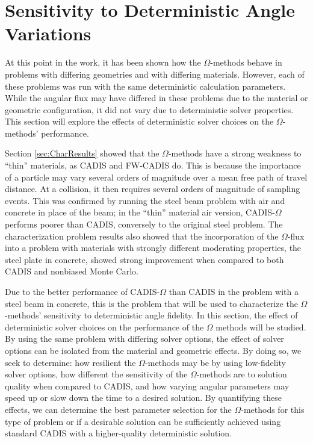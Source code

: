 \section{Sensitivity to Deterministic Angle Variations}
\label{sec:AngleResults}

At this point in the work, it has been shown how the $\Omega$-methods
behave in problems with differing geometries and with differing materials.
However, each of these problems was run with the same deterministic calculation
parameters. While the angular flux may have differed in these problems due to
the material or geometric configuration, it did not vary due to deterministic
solver properties. This section will explore the effects of deterministic solver
choices on the $\Omega$-methods' performance.

Section \ref{sec:CharResults} showed that the $\Omega$-methods have a strong
weakness to ``thin'' materials, as CADIS and FW-CADIS do. This is because the
importance of a particle may vary several orders of magnitude over a mean free
path of travel distance. At a collision, it then requires several orders of
magnitude of sampling events. This was confirmed by
running the steel beam problem with air and concrete in place of the beam; in
the ``thin'' material air version, CADIS-$\Omega$ performs poorer than CADIS,
conversely to the original steel problem.
The characterization problem results also showed that
the incorporation of the $\Omega$-flux into a problem with materials with
strongly different moderating properties, the steel plate in concrete, showed
strong improvement when compared to both CADIS and nonbiased Monte Carlo.

Due to the better performance of CADIS-$\Omega$ than CADIS
in the problem with a steel beam in concrete, this is the problem that will be
used to characterize the $\Omega$-methods' sensitivity to deterministic angle
fidelity. In this section, the effect of deterministic solver choices on the
performance of the $\Omega$ methods will be studied. By using the same problem
with differing solver options, the effect of solver options can be isolated from
the material and geometric effects. By doing so, we seek to determine: how
resilient the $\Omega$-methods may be by using low-fidelity solver options, how
different the sensitivity of the $\Omega$-methods are to solution quality when
compared to CADIS, and how varying angular parameters may speed up or slow down
the time to a desired solution. By quantifying these effects, we can determine
the best parameter selection for the $\Omega$-methods for this type of problem
or if a desirable solution
can be sufficiently achieved using standard CADIS with a higher-quality
deterministic solution.

